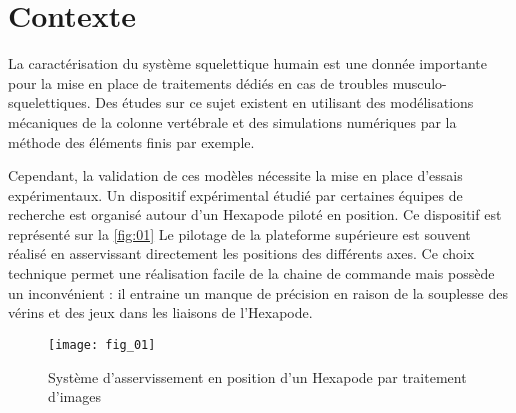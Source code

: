 
\section*{Contexte}

La caractérisation du système squelettique humain est une donnée importante pour la mise en place de traitements
dédiés en cas de troubles musculo-squelettiques. Des études sur ce sujet existent en utilisant des modélisations
mécaniques de la colonne vertébrale et des simulations numériques par la méthode des éléments finis
par exemple.

Cependant, la validation de ces modèles nécessite la mise en place d’essais expérimentaux. Un dispositif expérimental
étudié par certaines équipes de recherche est organisé autour d’un Hexapode piloté en position. Ce
dispositif est représenté sur la \autoref{fig:01} Le pilotage de la plateforme supérieure est souvent réalisé en asservissant
directement les positions des différents axes. Ce choix technique permet une réalisation facile de la chaine de
commande mais possède un inconvénient : il entraine un manque de précision en raison de la souplesse des vérins
et des jeux dans les liaisons de l’Hexapode.

\begin{figure}[H]
\centering
\texttt{[image: fig\_01]}
\caption{\label{fig:01} Système d’asservissement en position d’un Hexapode par traitement d’images}
\end{figure}



